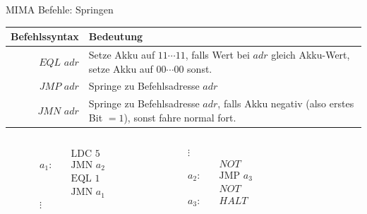 \begin{frame}{MIMA Befehle: Springen}
	\begin{tabular}{r | p{8cm} }
		Befehlssyntax & Bedeutung\\\hline\hline 
		$EQL$ $adr$ & Setze Akku auf $11\cdots11$, falls Wert bei $adr$ gleich Akku-Wert, setze Akku auf $00\cdots00$ sonst.\\\hline
		$JMP$ $adr$ & Springe zu Befehlsadresse $adr$\\\hline
		$JMN$ $adr$ & Springe zu Befehlsadresse $adr$, falls Akku negativ (also erstes Bit $=1$), sonst fahre normal fort.
	\end{tabular}
	
	\bp 
	\vspace{.5cm}
	\vspace{.0cm}
	
	\begin{columns}
		\begin{column}{0.25\textwidth}
			\begin{align*}
				& \text{LDC 5} \\
				a_1: \quad  & \text{JMN } a_2 \\
				& \text{EQL 1} \\
				& \text{JMN } a_1 \\
				\vdots
			\end{align*}
		\end{column}
		\begin{column}{0.25\textwidth}
			\begin{align*}
				\vdots \\
				& NOT \\ %
				a_2: \quad & \text{JMP } a_3\\
				& NOT \\ %
				a_3: \quad & HALT
			\end{align*}
		\end{column}
	
		\begin{column}{0.5\textwidth}
			\begin{memory}
			\end{memory}
		\end{column}
	\end{columns}
\end{frame}

